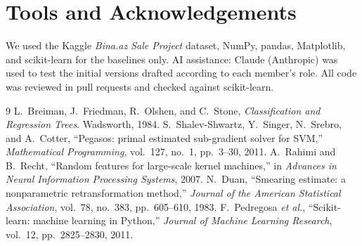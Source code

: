 \documentclass[10pt,twocolumn,a4paper]{article}
\begin{document}
\section*{Tools and Acknowledgements}
We used the Kaggle \emph{Bina.az Sale Project} dataset, NumPy, pandas,
Matplotlib, and scikit-learn for the baselines only. AI assistance: Claude
(Anthropic) was used to test the initial versions drafted according to each member's role. All code was
reviewed in pull requests and checked against scikit-learn.


\begin{thebibliography}{9}
L.~Breiman, J.~Friedman, R.~Olshen, and C.~Stone,
\emph{Classification and Regression Trees}. Wadsworth, 1984.
S.~Shalev-Shwartz, Y.~Singer, N.~Srebro, and A.~Cotter,
``Pegasos: primal estimated sub-gradient solver for SVM,''
\emph{Mathematical Programming}, vol.~127, no.~1, pp.~3--30, 2011.
A.~Rahimi and B.~Recht, ``Random features for large-scale kernel
machines,'' in \emph{Advances in Neural Information Processing Systems},
2007.
N.~Duan, ``Smearing estimate: a nonparametric retransformation method,''
\emph{Journal of the American Statistical Association}, vol.~78,
no.~383, pp.~605--610, 1983.
F.~Pedregosa \emph{et al.}, ``Scikit-learn: machine learning in Python,''
\emph{Journal of Machine Learning Research}, vol.~12, pp.~2825--2830, 2011.
\end{thebibliography}
\end{document}
